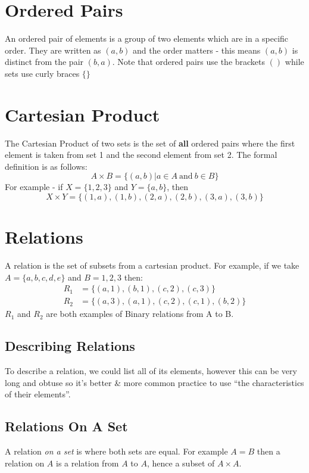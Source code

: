 
\section{Ordered Pairs}
An ordered pair of elements is a group of two elements which are in a specific order. They are written as $(a, b)$ and the order matters - this means $(a, b)$ is distinct from the pair $(b, a)$. Note that ordered pairs use the brackets $()$ while sets use curly braces $\{\}$

\section{Cartesian Product}
The Cartesian Product of two sets is the set of \textbf{all} ordered pairs where the first element is taken from set 1 and the second element from set 2. The formal definition is as follows:
\[A \times B = \{(a, b) | a \in A \mathrm{\ and\ } b \in B\}\]
For example - if $X = \{1, 2, 3\}$ and $Y = \{a, b\}$, then
\[X \times Y = \{(1, a), (1, b), (2, a), (2, b), (3, a), (3, b)\}\]

\section{Relations}
A relation is the set of subsets from a cartesian product. For example, if we take $A = \{a, b, c, d, e\}$ and $B = {1, 2, 3}$ then:
\begin{align*}
    R_1 &= \{(a, 1), (b, 1), (c, 2), (c, 3)\}\\
    R_2 &= \{(a,3), (a,1),(c,2),(c,1),(b,2)\}
\end{align*}
$R_1$ and $R_2$ are both examples of Binary relations from A to B. 

\subsection{Describing Relations}
To describe a relation, we could list all of its elements, however this can be very long and obtuse so it's better \& more common practice to use ``the characteristics of their elements''. 

\subsection{Relations On A Set}
A relation \textit{on a set} is where both sets are equal. For example $A = B$ then a relation on $A$ is a relation from $A$ to $A$, hence a subset of $A \times A$. \\

